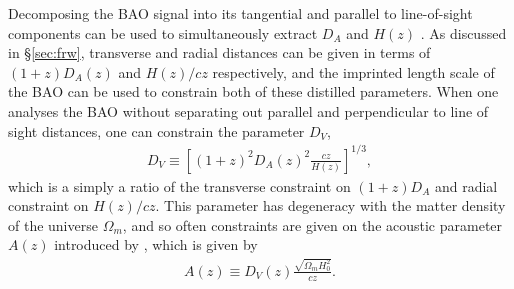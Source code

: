 \documentclass[titlesmallcaps, examinerscopy, copyrightpage]{uqthesis}
\begin{document}
Decomposing the BAO signal into its tangential and parallel to line-of-sight components can be used to simultaneously extract $D_A$ and $H(z)$ \citep{BlakeGlazebrook2003, SeoEisenstein2003, Wang2006}. As discussed in \S\ref{sec:frw}, transverse and radial distances can be given in terms of $(1+z) D_A(z)$ and $H(z)/cz$ respectively, and the imprinted length scale of the BAO can be used to constrain both of these distilled parameters. When one analyses the BAO without separating out parallel and perpendicular to line of sight distances, one can constrain the parameter $D_V$, 
\begin{align}
D_V \equiv \left[ (1+z)^2 D_A(z)^2 \frac{cz}{H(z)}\right]^{1/3},
\end{align}
which is a simply a ratio of the transverse constraint on $(1+z) D_A$ and radial constraint on $H(z)/cz$. This parameter has degeneracy with the matter density of the universe $\Omega_m$, and so often constraints are given on the acoustic parameter $A(z)$ introduced by \citet{EisensteinZehavi2005}, which is given by
\begin{align}
A(z) \equiv D_V(z) \frac{\sqrt{\Omega_m H_0^2}}{cz}.
\end{align}
\end{document}
